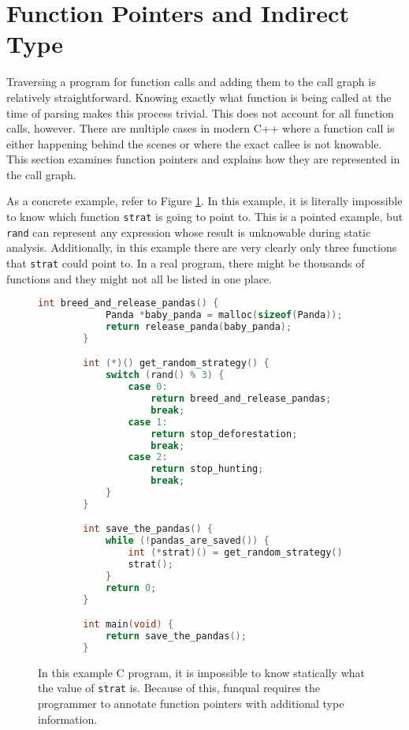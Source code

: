 \section{Function Pointers and Indirect Type}\label{sec:rules:funptrs}

Traversing a program for function calls and adding them to the call graph is relatively straightforward.  Knowing exactly what function is being called at the time of parsing makes this process trivial.  This does not account for all function calls, however.  There are multiple cases in modern C++ where a function call is either happening behind the scenes or where the exact callee is not knowable.  This section examines function pointers and explains how they are represented in the call graph.  

As a concrete example, refer to Figure \ref{lst:rules:ptreg}.  In this example, it is literally impossible to know which function \lstinline{strat} is going to point to.  This is a pointed example, but \lstinline{rand} can represent any expression whose result is unknowable during static analysis.  Additionally, in this example there are very clearly only three functions that \lstinline{strat} could point to.  In a real program, there might be thousands of functions and they might not all be listed in one place.  

\begin{figure}
    \begin{lstlisting}[language=C,gobble=8]
        int breed_and_release_pandas() {
            Panda *baby_panda = malloc(sizeof(Panda));
            return release_panda(baby_panda);
        }

        int (*)() get_random_strategy() {
            switch (rand() % 3) {
                case 0:
                    return breed_and_release_pandas;
                    break;
                case 1:
                    return stop_deforestation;
                    break;
                case 2:
                    return stop_hunting;
                    break;
            }
        }

        int save_the_pandas() {
            while (!pandas_are_saved()) {
                int (*strat)() = get_random_strategy()
                strat();
            }
            return 0;
        }

        int main(void) {
            return save_the_pandas();
        }
    \end{lstlisting}
    \caption{In this example C program, it is impossible to know statically what the value of \lstinline{strat} is.  Because of this, funqual requires the programmer to annotate function pointers with additional type information. }
    \label{lst:rules:ptreg}
\end{figure}


